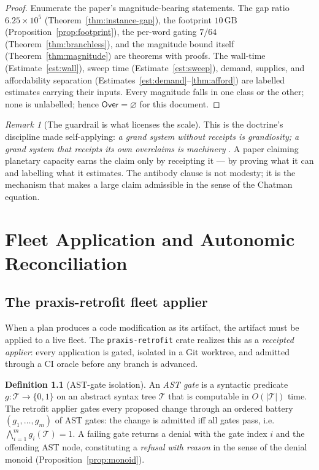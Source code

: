 \documentclass[11pt,oneside]{book}
\theoremstyle{definition}
\newtheorem{definition}{Definition}[chapter]
\theoremstyle{plain}
\theoremstyle{remark}
\newtheorem*{remark}{Remark}
\newcommand{\code}[1]{\texttt{#1}}
\newcommand{\Over}{\mathsf{Over}}
\begin{document}
\begin{proof}
Enumerate the paper's magnitude-bearing statements. The gap ratio $6.25\times 10^{5}$
(Theorem~\ref{thm:instance-gap}), the footprint $10\,\mathrm{GB}$ (Proposition~\ref{prop:footprint}),
the per-word gating $7/64$ (Theorem~\ref{thm:branchless}), and the magnitude bound itself
(Theorem~\ref{thm:magnitude}) are theorems with proofs. The wall-time
(Estimate~\ref{est:wall}), sweep time (Estimate~\ref{est:sweep}), demand, supplies, and
affordability separation (Estimates~\ref{est:demand}--\ref{thm:afford}) are labelled estimates
carrying their inputs. Every magnitude falls in one class or the other; none is unlabelled; hence
$\Over=\varnothing$ for this document.
\end{proof}

\begin{remark}[The guardrail is what licenses the scale]
This is the doctrine's discipline made self-applying: \emph{a grand system without receipts is
grandiosity; a grand system that receipts its own overclaims is machinery} \cite[Ch.~6]{keystone}.
A paper claiming planetary capacity earns the claim only by receipting it --- by proving what it
can and labelling what it estimates. The antibody clause is not modesty; it is the mechanism that
makes a large claim admissible in the sense of the Chatman equation.
\end{remark}

\chapter{Fleet Application and Autonomic Reconciliation}
\label{ch:retrofit}

\section{The praxis-retrofit fleet applier}

When a plan produces a code modification as its artifact, the artifact must be applied to
a live fleet. The \code{praxis-retrofit} crate realizes this as a \emph{receipted applier}:
every application is gated, isolated in a Git worktree, and admitted through a CI oracle
before any branch is advanced.

\begin{definition}[AST-gate isolation]\label{def:astgate}
An \emph{AST gate} is a syntactic predicate $g:\mathcal{T}\to\{0,1\}$ on an abstract
syntax tree $\mathcal{T}$ that is computable in $O(|\mathcal{T}|)$ time. The retrofit
applier gates every proposed change through an ordered battery
$(g_1,\dots,g_m)$ of AST gates: the change is admitted iff all gates pass, i.e.\
$\bigwedge_{i=1}^m g_i(\mathcal{T})=1$. A failing gate returns a denial with the gate
index $i$ and the offending AST node, constituting a \emph{refusal with reason} in the
sense of the denial monoid (Proposition~\ref{prop:monoid}).
\end{definition}
\end{document}
